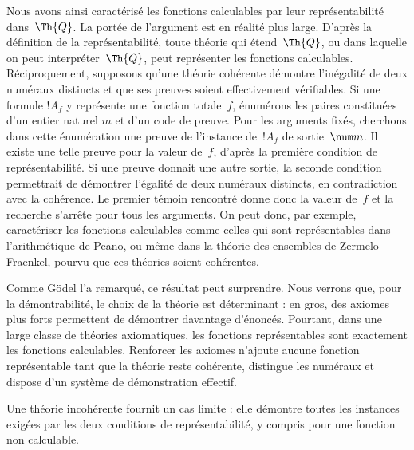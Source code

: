 \documentclass[../../../include/open-logic-section]{subfiles}
\begin{document}
\begin{explain}
Nous avons ainsi caractérisé les fonctions calculables par leur
représentabilité dans~$\Th{Q}$. La portée de l'argument est en
réalité plus large. D'après la définition de la représentabilité,
toute théorie qui étend~$\Th{Q}$, ou dans laquelle on peut
interpréter~$\Th{Q}$, peut représenter les fonctions calculables.
Réciproquement, supposons qu'une théorie cohérente démontre
l'inégalité de deux numéraux distincts et que ses preuves
soient effectivement vérifiables. Si une formule $!A_f$ y
représente une fonction totale~$f$, énumérons les paires
constituées d'un entier naturel $m$ et d'un code de preuve.
Pour les arguments fixés, cherchons dans cette énumération une
preuve de l'instance de~$!A_f$ de sortie~$\num m$. Il existe
une telle preuve pour la valeur de~$f$, d'après la première
condition de représentabilité. Si une preuve donnait une
autre sortie, la seconde condition permettrait de démontrer
l'égalité de deux numéraux distincts, en contradiction avec la
cohérence. Le premier témoin rencontré donne donc la valeur
de~$f$ et la recherche s'arrête pour tous les arguments.
On peut donc, par exemple,
caractériser les fonctions calculables comme celles qui sont
représentables dans l'arithmétique de Peano, ou même dans la
théorie des ensembles de Zermelo--Fraenkel, pourvu que ces théories soient cohérentes.

Comme Gödel l'a remarqué, ce résultat peut surprendre. Nous
verrons que, pour la démontrabilité, le choix de la théorie est
déterminant : en gros, des axiomes plus forts permettent de
démontrer davantage d'énoncés. Pourtant, dans une large classe
de théories axiomatiques, les fonctions représentables sont
exactement les fonctions calculables. Renforcer les axiomes
n'ajoute aucune fonction représentable tant que la théorie
reste cohérente, distingue les numéraux et dispose d'un système
de démonstration effectif.
\end{explain}

Une théorie incohérente fournit un cas limite : elle démontre
toutes les instances exigées par les deux conditions de
représentabilité, y compris pour une fonction non calculable.
\end{document}
